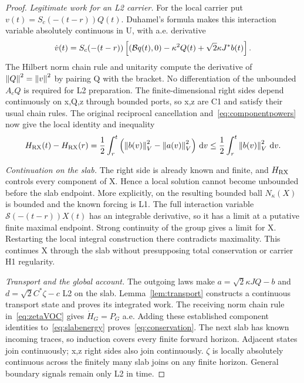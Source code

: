 \begin{proof}
\textit{Legitimate work for an L2 carrier.}
For the local carrier put $v(t)=S_c(-(t-r))Q(t)$. Duhamel's formula makes this interaction variable absolutely continuous in U, with a.e. derivative
\begin{equation}\label{eq:interactionderivative}
\dot v(t)=S_c(-(t-r))\left[(\mathcal B q(t),0)-\kappa^2Q(t)+\sqrt2\kappa J^*b(t)\right].
\end{equation}
The Hilbert norm chain rule and unitarity compute the derivative of $\left\lVert Q\right\rVert^2=\left\lVert v\right\rVert^2$ by pairing Q with the bracket. No differentiation of the unbounded $A_cQ$ is required for L2 preparation. The finite-dimensional right sides depend continuously on x,Q,z through bounded ports, so x,z are C1 and satisfy their usual chain rules. The original reciprocal cancellation and~\eqref{eq:componentpowers} now give the local identity and inequality
\begin{equation}\label{eq:slabenergy}
H_{\rm RX}(t)-H_{\rm RX}(r)
=\frac12\int_r^t\left(\left\lVert b(v)\right\rVert_V^2-\left\lVert a(v)\right\rVert_V^2\right)\,\mathrm d v
\le\frac12\int_r^t\left\lVert b(v)\right\rVert_V^2\,\mathrm d v.
\end{equation}

\textit{Continuation on the slab.}
The right side is already known and finite, and $H_{\rm RX}$ controls every component of X. Hence a local solution cannot become unbounded before the slab endpoint. More explicitly, on the resulting bounded ball $N_\kappa(X)$ is bounded and the known forcing is L1. The full interaction variable $\mathcal S(-(t-r))X(t)$ has an integrable derivative, so it has a limit at a putative finite maximal endpoint. Strong continuity of the group gives a limit for X. Restarting the local integral construction there contradicts maximality. This continues X through the slab without presupposing total conservation or carrier H1 regularity.

\textit{Transport and the global account.}
The outgoing laws make $a=\sqrt2\kappa JQ-b$ and $d=\sqrt2C^*\zeta-c$ L2 on the slab. Lemma~\ref{lem:transport} constructs a continuous transport state and proves its integrated work. The receiving norm chain rule in~\eqref{eq:zetaVOC} gives $\dot H_G=P_G$ a.e. Adding these established component identities to~\eqref{eq:slabenergy} proves~\eqref{eq:conservation}. The next slab has known incoming traces, so induction covers every finite forward horizon. Adjacent states join continuously; x,z right sides also join continuously. $\zeta$ is locally absolutely continuous across the finitely many slab joins on any finite horizon. General boundary signals remain only L2 in time.


\end{proof}
